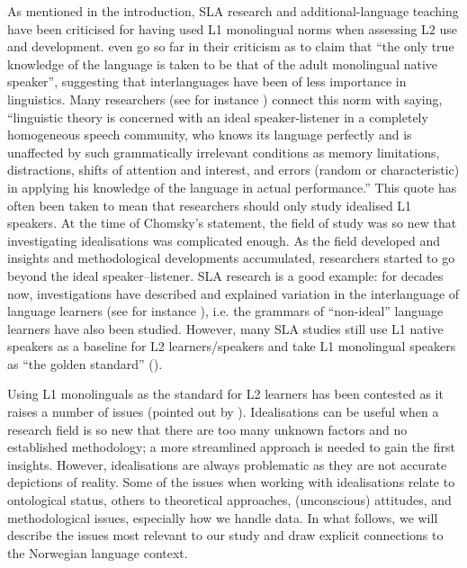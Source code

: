 \documentclass[output=paper,colorlinks,citecolor=brown,modfonts,nonflat]{../langscibook}
\begin{document}
As mentioned in the introduction, SLA research and additional-language teaching have been criticised for having used L1 monolingual norms when assessing L2 use and development. \citet[221]{CookNewson2007} even go so far in their criticism as to claim that “the only true knowledge of the language is taken to be that of the adult monolingual native speaker”, suggesting that interlanguages have been of less importance in linguistics. Many researchers (see for instance \citealt{Saniei2011}) connect this norm with \citet[3]{Chomsky1965} saying, “linguistic theory is concerned with an ideal speaker-listener in a completely homogeneous speech community, who knows its language perfectly and is unaffected by such grammatically irrelevant conditions as memory limitations, distractions, shifts of attention and interest, and errors (random or characteristic) in applying his knowledge of the language in actual performance.” This quote has often been taken to mean that researchers should only study idealised L1 speakers. At the time of Chomsky’s statement, the field of study was so new that investigating idealisations was complicated enough. As the field developed and insights and methodological developments accumulated, researchers started to go beyond the ideal speaker–listener. SLA research is a good example: for decades now, investigations have described and explained variation in the interlanguage of language learners (see for instance \citealt{Corder1967,Selinker1972}), i.e. the grammars of “non-ideal” language learners have also been studied. However, many SLA studies still use L1 native speakers as a baseline for L2 learners/speakers and take L1 monolingual speakers as “the golden standard” (\citealt[29]{AmaralRoeper2014}).

Using L1 monolinguals as the standard for L2 learners has been contested as it raises a number of issues (pointed out by \citealt{CookNewson2007,AmaralRoeper2014,Slabakova2016,TheDouglasFirGroup2016,Ortega2019}). Idealisations can be useful when a research field is so new that there are too many unknown factors and no established methodology; a more streamlined approach is needed to gain the first insights. However, idealisations are always problematic as they are not accurate depictions of reality. Some of the issues when working with idealisations relate to ontological status, others to theoretical approaches, (unconscious) attitudes, and methodological issues, especially how we handle data. In what follows, we will describe the issues most relevant to our study and draw explicit connections to the Norwegian language context.
\end{document}

